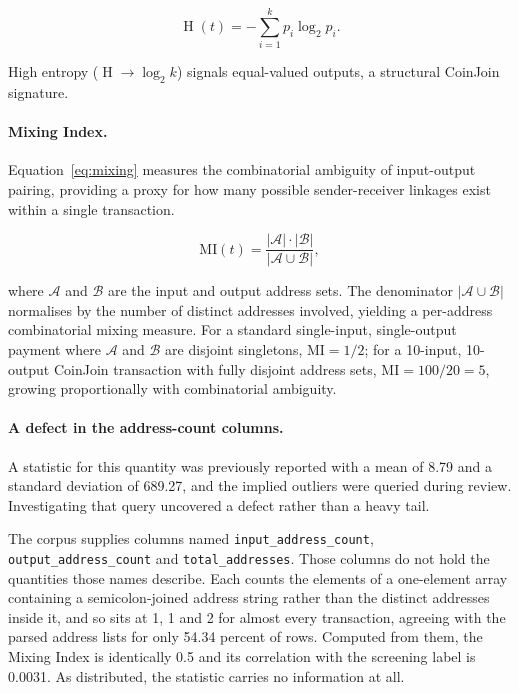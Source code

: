 \documentclass[12pt,a4paper]{article}
\DeclareMathOperator{\Entropy}{H}
\begin{document}
\begin{equation}
  \Entropy(t) = -\sum_{i=1}^{k} p_i \log_2 p_i.
  \label{eq:entropy}
\end{equation}

High entropy ($\Entropy \to \log_2 k$) signals equal-valued
outputs, a structural CoinJoin signature.

\paragraph{Mixing Index.}
Equation~\eqref{eq:mixing} measures the combinatorial
ambiguity of input-output pairing, providing a proxy for
how many possible sender-receiver linkages exist within
a single transaction.

\begin{equation}
  \text{MI}(t) = \frac{|\mathcal{A}| \cdot |\mathcal{B}|}
                      {|\mathcal{A} \cup \mathcal{B}|},
  \label{eq:mixing}
\end{equation}

where $\mathcal{A}$ and $\mathcal{B}$ are the input and
output address sets. The denominator $|\mathcal{A} \cup
\mathcal{B}|$ normalises by the number of distinct addresses
involved, yielding a per-address combinatorial mixing
measure. For a standard single-input, single-output payment
where $\mathcal{A}$ and $\mathcal{B}$ are disjoint singletons,
$\text{MI} = 1/2$; for a 10-input, 10-output CoinJoin
transaction with fully disjoint address sets,
$\text{MI} = 100/20 = 5$, growing proportionally with
combinatorial ambiguity.

\paragraph{A defect in the address-count columns.}
A statistic for this quantity was previously reported with a mean
of 8.79 and a standard deviation of 689.27, and the implied
outliers were queried during review. Investigating that query
uncovered a defect rather than a heavy tail.

The corpus supplies columns named
\texttt{input\_address\_count}, \texttt{output\_address\_count}
and \texttt{total\_addresses}. Those columns do not hold the
quantities those names describe. Each counts the elements of a
one-element array containing a semicolon-joined address string
rather than the distinct addresses inside it, and so sits at 1, 1
and 2 for almost every transaction, agreeing with the parsed
address lists for only 54.34 percent of rows. Computed from them,
the Mixing Index is identically 0.5 and its correlation with the
screening label is 0.0031. As distributed, the statistic carries
no information at all.
\end{document}
